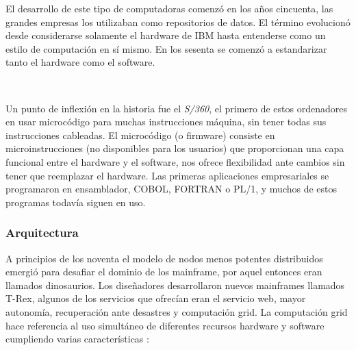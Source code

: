 \documentclass[paper=a4, fontsize=10pt]{scrartcl} %
\numberwithin{equation}{section} %
\numberwithin{figure}{section} %
\numberwithin{table}{section} %
\begin{document}
El desarrollo de este tipo de computadoras comenzó en los años cincuenta, las grandes empresas los utilizaban como repositorios de datos.
El término evolucionó desde considerarse solamente el hardware de IBM hasta entenderse como un estilo de computación en sí mismo.
En los sesenta se comenzó a estandarizar tanto el hardware como el software.

\

Un punto de inflexión en la historia fue el \textit{S/360}, el primero de estos ordenadores en usar microcódigo para muchas instrucciones máquina, sin tener todas sus instrucciones cableadas. 
El microcódigo (o firmware) consiste en microinstrucciones (no disponibles para los usuarios) que proporcionan una capa funcional entre el hardware y el software, nos ofrece flexibilidad ante cambios sin tener que reemplazar el hardware.
Las primeras aplicaciones empresariales se programaron en ensamblador, COBOL, FORTRAN o PL/1, y muchos de estos programas todavía siguen en uso.

\subsubsection{Arquitectura}
A principios de los noventa el modelo de nodos menos potentes distribuidos emergió para desafiar el dominio de los mainframe, por aquel entonces eran llamados dinosaurios.
Los diseñadores desarrollaron nuevos mainframes llamados T-Rex, algunos de los servicios que ofrecían eran el servicio web, mayor autonomía, recuperación ante desastres y computación grid.
La computación grid hace referencia al uso simultáneo de diferentes recursos hardware y software cumpliendo varias características \cite{grid-def}:
\end{document}
